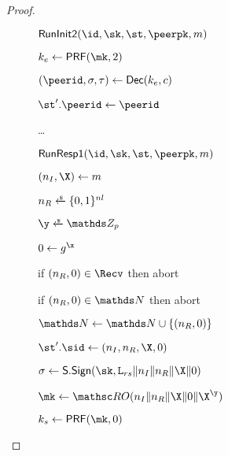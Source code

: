 \begin{proof}
\begin{collectinmacro}{\SIGMIProofRecordKeysInitiatorsCopy}{}{}
\begin{figure}[tp]
\begin{minipage}[t]{0.49\textwidth}
\begin{oracle}{$\RunInit(\id,\sk,\st,\peerpk,m)$}
      \item \hindent $\ke \gets \PRF(\mk,2)$
      \item $(\peerid,\sigma, \tau) \gets \ENCDec(\ke,\ciph)$
      \item $\st'.\peerid \gets \peerid$
      \item \ldots
    \end{oracle}
    \end{minipage}
    \begin{minipage}[t]{0.49\textwidth}
    \ExptSepSpace
    \begin{oracle}{$\RunRespI(\id,\sk,\st,\peerpk,m)$}
      \item $(\nonce_I,\X) \gets m$
      \item $\nonce_R \sample \bits^{\nl}$
      \item $\y \sample \ZZ_p$
      \item $\Y \gets g^{\x}$
      \item if $(\nonce_R,\Y) \in \Recv$ then abort
      \item if $(\nonce_R, \Y) \in \N$ then abort
      \item $\N \gets \N \cup \{(\nonce_R,\Y)\}$
      \item $\st'.\sid \gets (\nonce_I, \nonce_R,\X,\Y)$
      \item $\sigma \gets \SIGScheme.\SIGSign(\sk,\labelrs\|\nonce_I\|\nonce_R\|\X\|\Y)$
      \item $\mk \gets \RO(\nonce_I\|\nonce_R\|\X\|\Y\|\X^{\y})$
      \item $\ks \gets \PRF(\mk,0)$

\end{oracle}
\end{minipage}
\end{figure}
\end{collectinmacro}
\end{proof}
